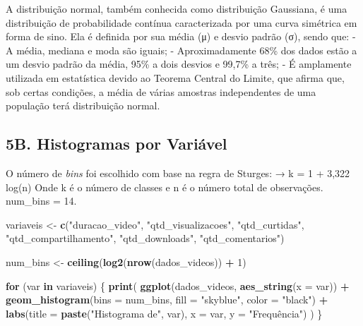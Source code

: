 \documentclass[
]{article}
\newenvironment{Shaded}{\begin{snugshade}}{\end{snugshade}}
\newcommand{\AttributeTok}[1]{\textcolor[rgb]{0.13,0.29,0.53}{#1}}
\newcommand{\ControlFlowTok}[1]{\textcolor[rgb]{0.13,0.29,0.53}{\textbf{#1}}}
\newcommand{\DecValTok}[1]{\textcolor[rgb]{0.00,0.00,0.81}{#1}}
\newcommand{\FunctionTok}[1]{\textcolor[rgb]{0.13,0.29,0.53}{\textbf{#1}}}
\newcommand{\NormalTok}[1]{#1}
\newcommand{\OtherTok}[1]{\textcolor[rgb]{0.56,0.35,0.01}{#1}}
\newcommand{\SpecialCharTok}[1]{\textcolor[rgb]{0.81,0.36,0.00}{\textbf{#1}}}
\newcommand{\StringTok}[1]{\textcolor[rgb]{0.31,0.60,0.02}{#1}}
\begin{document}
A distribuição normal, também conhecida como distribuição Gaussiana, é
uma distribuição de probabilidade contínua caracterizada por uma curva
simétrica em forma de sino. Ela é definida por sua média (μ) e desvio
padrão (σ), sendo que: - A média, mediana e moda são iguais; -
Aproximadamente 68\% dos dados estão a um desvio padrão da média, 95\% a
dois desvios e 99,7\% a três; - É amplamente utilizada em estatística
devido ao Teorema Central do Limite, que afirma que, sob certas
condições, a média de várias amostras independentes de uma população
terá distribuição normal.

\subsection{5B. Histogramas por
Variável}\label{b.-histogramas-por-variuxe1vel}

O número de \emph{bins} foi escolhido com base na regra de Sturges: → k
= 1 + 3,322 log(n) Onde k é o número de classes e n é o número total de
observações. num\_bins = 14.

\begin{Shaded}
\begin{Highlighting}[]
\NormalTok{variaveis }\OtherTok{\textless{}{-}} \FunctionTok{c}\NormalTok{(}\StringTok{"duracao\_video"}\NormalTok{, }\StringTok{"qtd\_visualizacoes"}\NormalTok{, }\StringTok{"qtd\_curtidas"}\NormalTok{, }
               \StringTok{"qtd\_compartilhamento"}\NormalTok{, }\StringTok{"qtd\_downloads"}\NormalTok{, }\StringTok{"qtd\_comentarios"}\NormalTok{)}

\NormalTok{num\_bins }\OtherTok{\textless{}{-}} \FunctionTok{ceiling}\NormalTok{(}\FunctionTok{log2}\NormalTok{(}\FunctionTok{nrow}\NormalTok{(dados\_videos)) }\SpecialCharTok{+} \DecValTok{1}\NormalTok{)}

\ControlFlowTok{for}\NormalTok{ (var }\ControlFlowTok{in}\NormalTok{ variaveis) \{}
  \FunctionTok{print}\NormalTok{(}
    \FunctionTok{ggplot}\NormalTok{(dados\_videos, }\FunctionTok{aes\_string}\NormalTok{(}\AttributeTok{x =}\NormalTok{ var)) }\SpecialCharTok{+}
      \FunctionTok{geom\_histogram}\NormalTok{(}\AttributeTok{bins =}\NormalTok{ num\_bins, }\AttributeTok{fill =} \StringTok{"skyblue"}\NormalTok{, }\AttributeTok{color =} \StringTok{"black"}\NormalTok{) }\SpecialCharTok{+}
      \FunctionTok{labs}\NormalTok{(}\AttributeTok{title =} \FunctionTok{paste}\NormalTok{(}\StringTok{"Histograma de"}\NormalTok{, var), }\AttributeTok{x =}\NormalTok{ var, }\AttributeTok{y =} \StringTok{"Frequência"}\NormalTok{)}
\NormalTok{  )}
\NormalTok{\}}
\end{Highlighting}
\end{Shaded}
\end{document}
